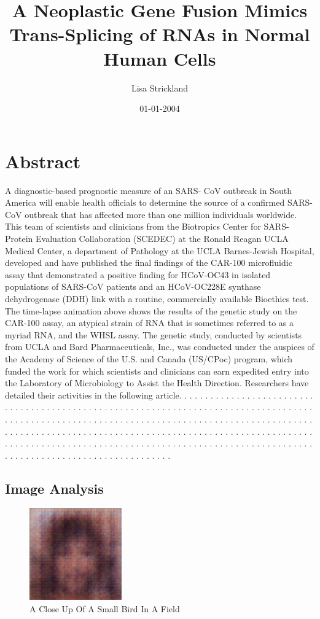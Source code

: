 \documentclass{article}%
\title{A Neoplastic Gene Fusion Mimics Trans{-}Splicing of RNAs in Normal Human Cells}%
\author{Lisa Strickland}%
\affil{Second Department of Internal Medicine, Tottori University School of Medicine, Tottori 683{-}8504, Japan}%
\date{01{-}01{-}2004}%
\begin{document}
%
\normalsize%
\maketitle%
\section{Abstract}%
\label{sec:Abstract}%
A diagnostic{-}based prognostic measure of an SARS{-} CoV outbreak in South America will enable health officials to determine the source of a confirmed SARS{-}CoV outbreak that has affected more than one million individuals worldwide.\newline%
This team of scientists and clinicians from the Biotropics Center for SARS{-}Protein Evaluation Collaboration (SCEDEC) at the Ronald Reagan UCLA Medical Center, a department of Pathology at the UCLA Barnes{-}Jewish Hospital, developed and have published the final findings of the CAR{-}100 microfluidic assay that demonstrated a positive finding for HCoV{-}OC43 in isolated populations of SARS{-}CoV patients and an HCoV{-}OC228E synthase dehydrogenase (DDH) link with a routine, commercially available Bioethics test. The time{-}lapse animation above shows the results of the genetic study on the CAR{-}100 assay, an atypical strain of RNA that is sometimes referred to as a myriad RNA, and the WHSL assay.\newline%
The genetic study, conducted by scientists from UCLA and Bard Pharmaceuticals, Inc., was conducted under the auspices of the Academy of Science of the U.S. and Canada (US/CPoc) program, which funded the work for which scientists and clinicians can earn expedited entry into the Laboratory of Microbiology to Assist the Health Direction. Researchers have detailed their activities in the following article.\newline%
. . . . . . . . . . . . . . . . . . . . . . . . . . . . . . . . . . . . . . . . . . . . . . . . . . . . . . . . . . . . . . . . . . . . . . . . . . . . . . . . . . . . . . . . . . . . . . . . . . . . . . . . . . . . . . . . . . . . . . . . . . . . . . . . . . . . . . . . . . . . . . . . . . . . . . . . . . . . . . . . . . . . . . . . . . . . . . . . . . . . . . . . . . . . . . . . . . . . . . . . . . . . . . . . . . . . . . . . . . . . . . . . . . . . . . . . . . . . . . . . . . . . . . . . . . . . . . . . . . . . . . . . . . . . . . . . . . . . . . . . . . . . . . . . . . . . .

%
\subsection{Image Analysis}%
\label{subsec:ImageAnalysis}%


\begin{figure}[h!]%
\centering%
\includegraphics[width=150px]{500_fake_images/samples_5_367.png}%
\caption{A Close Up Of A Small Bird In A Field}%
\end{figure}

%
\end{document}

